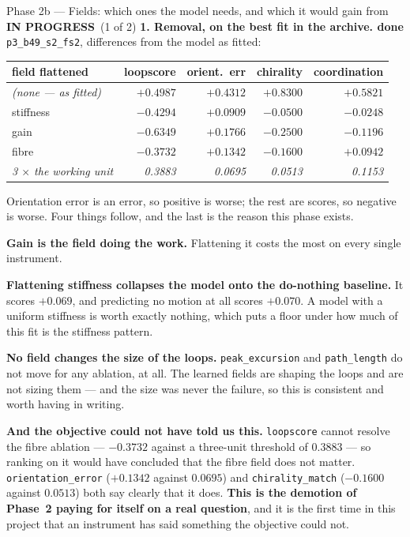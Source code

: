 \documentclass[11pt,a4paper]{article}
\newcommand{\code}[1]{\texttt{#1}}
\newcommand{\dn}{\textcolor{good}{\textbf{done}}}
\newcommand{\prog}{\textcolor{warn}{\textbf{IN PROGRESS}}}
\begin{document}
\begin{phasebox}{Phase 2b --- Fields: which ones the model needs, and which it would gain from \hfill \prog\ (1 of 2)}
\textbf{1. Removal, on the best fit in the archive. \dn} \code{p3\_b49\_s2\_fs2}, differences from
the model as fitted:

\begin{center}\small
\begin{tabular}{@{}l r r r r@{}}
\toprule
\textbf{field flattened} & \textbf{loopscore} & \textbf{orient.\ err} & \textbf{chirality} &
\textbf{coordination}\\
\midrule
\emph{(none --- as fitted)} & $+0.4987$ & $+0.4312$ & $+0.8300$ & $+0.5821$\\
\midrule
stiffness & $-0.4294$ & $+0.0909$ & $-0.0500$ & $-0.0248$\\
gain & $\mathbf{-0.6349}$ & $\mathbf{+0.1766}$ & $\mathbf{-0.2500}$ & $\mathbf{-0.1196}$\\
fibre & $-0.3732$ & $+0.1342$ & $-0.1600$ & $+0.0942$\\
\midrule
\emph{3 $\times$ the working unit} & \emph{0.3883} & \emph{0.0695} & \emph{0.0513} & \emph{0.1153}\\
\bottomrule
\end{tabular}
\end{center}

\noindent Orientation error is an error, so positive is worse; the rest are scores, so negative is
worse. Four things follow, and the last is the reason this phase exists.

\textbf{Gain is the field doing the work.} Flattening it costs the most on every single instrument.

\textbf{Flattening stiffness collapses the model onto the do-nothing baseline.} It scores $+0.069$,
and predicting no motion at all scores $+0.070$. A model with a uniform stiffness is worth exactly
nothing, which puts a floor under how much of this fit is the stiffness pattern.

\textbf{No field changes the size of the loops.} \code{peak\_excursion} and \code{path\_length} do
not move for any ablation, at all. The learned fields are shaping the loops and are not sizing them
--- and the size was never the failure, so this is consistent and worth having in writing.

\textbf{And the objective could not have told us this.} \code{loopscore} cannot resolve the fibre
ablation --- $-0.3732$ against a three-unit threshold of $0.3883$ --- so ranking on it would have
concluded that the fibre field does not matter. \code{orientation\_error} ($+0.1342$ against
$0.0695$) and \code{chirality\_match} ($-0.1600$ against $0.0513$) both say clearly that it does.
\textbf{This is the demotion of Phase~2 paying for itself on a real question}, and it is the first
time in this project that an instrument has said something the objective could not.


\end{phasebox}
\end{document}
